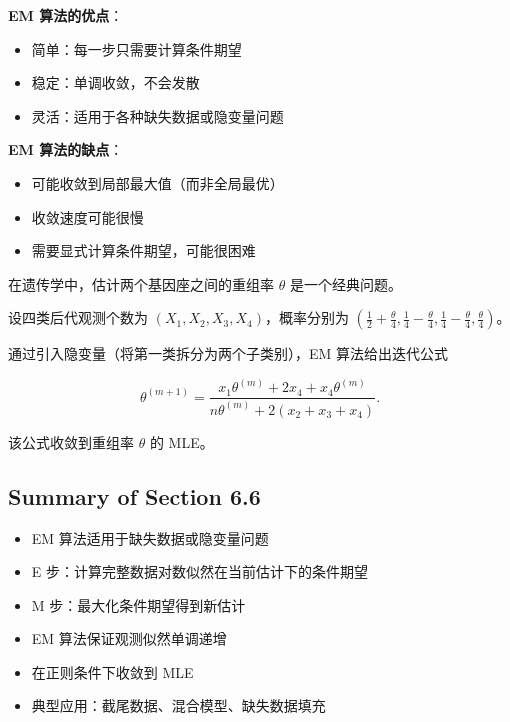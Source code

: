 \begin{remark}
\textbf{EM 算法的优点}：
\begin{itemize}
\item 简单：每一步只需要计算条件期望
\item 稳定：单调收敛，不会发散
\item 灵活：适用于各种缺失数据或隐变量问题
\end{itemize}

\textbf{EM 算法的缺点}：
\begin{itemize}
\item 可能收敛到局部最大值（而非全局最优）
\item 收敛速度可能很慢
\item 需要显式计算条件期望，可能很困难
\end{itemize}
\end{remark}

\begin{example}[遗传连锁的 EM 算法]\label{ex:em-genetics}
在遗传学中，估计两个基因座之间的重组率 $\theta$ 是一个经典问题。

设四类后代观测个数为 $(X_1, X_2, X_3, X_4)$，概率分别为 $(\frac{1}{2}+\frac{\theta}{4}, \frac{1}{4}-\frac{\theta}{4}, \frac{1}{4}-\frac{\theta}{4}, \frac{\theta}{4})$。

通过引入隐变量（将第一类拆分为两个子类别），EM 算法给出迭代公式

\[
\theta^{(m+1)} = \frac{x_1\theta^{(m)} + 2x_4 + x_4\theta^{(m)}}{n\theta^{(m)} + 2(x_2 + x_3 + x_4)}.
\label{eq:genetics-em-update}
\]

该公式收敛到重组率 $\theta$ 的 MLE。
\end{example}

\subsection{Summary of Section 6.6}

\begin{itemize}
\item EM 算法适用于缺失数据或隐变量问题
\item E 步：计算完整数据对数似然在当前估计下的条件期望
\item M 步：最大化条件期望得到新估计
\item EM 算法保证观测似然单调递增
\item 在正则条件下收敛到 MLE
\item 典型应用：截尾数据、混合模型、缺失数据填充
\end{itemize}

